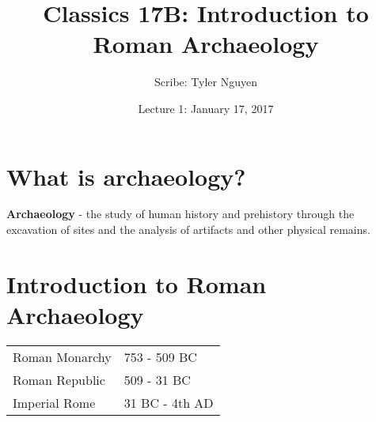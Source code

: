 \documentclass{article}
\begin{document}
\title{Classics 17B: Introduction to Roman Archaeology}
\author{Scribe: Tyler Nguyen}
\date{Lecture 1: January 17, 2017}
\maketitle
\section{What is archaeology?}
\textbf{Archaeology} - the study of human history and prehistory through the excavation of sites and the analysis of artifacts and other physical remains.
\section{Introduction to Roman Archaeology}
\begin{tabular}{ll}
Roman Monarchy & 753 - 509 BC\\
Roman Republic & 509 - 31 BC\\
Imperial Rome & 31 BC - 4th AD\\
\end{tabular}
\end{document}
